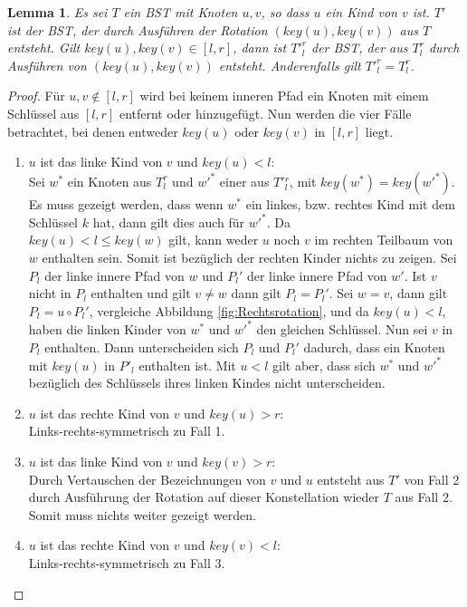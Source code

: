 \documentclass[a4paper,12pt]{article}
\newtheorem{Lemma}{Lemma}[section]
\begin{document}
\begin{Lemma}  \label{lemmaWilber1} Es sei $T$ ein BST mit Knoten $u, v$, so dass $u$ ein Kind von $v$ ist. $T'$ ist der BST, der durch Ausführen der Rotation $\left(\mathit{key}\left(u\right),\mathit{key}\left(v\right)\right)$ aus $T$ entsteht. Gilt $\mathit{key}\left(u\right),\mathit{key}\left(v\right) \in \left[l,r\right]$, dann ist ${T'}^r_l$ der BST, der aus $T^r_l$ durch Ausführen von  $\left(\mathit{key}\left(u\right),\mathit{key}\left(v\right)\right)$ entsteht. Anderenfalls gilt ${T'}^r_l = T^r_l$.
\end{Lemma}
\begin{proof}
	\noindent Für $u,v \notin \left[l,r\right]$ wird bei keinem inneren Pfad ein Knoten mit einem Schlüssel aus $\left[l,r\right]$ entfernt oder hinzugefügt.
	Nun werden die vier Fälle betrachtet, bei denen entweder $\mathit{key}\left(u\right)$ oder $\mathit{key}\left(v\right)$ in $\left[l,r\right]$ liegt.
	\begin{enumerate}
		\item $u$ ist das linke Kind von $v$ und $\mathit{key}\left(u\right) < l$:\\
		Sei $w^*$ ein Knoten aus $T^r_l$ und $w'^*$ einer aus $T'{^r_l}$, mit $\mathit{key}(w^*) = \mathit{key}(w'^*)$. Es muss gezeigt werden, dass wenn $w^*$ ein linkes, bzw. rechtes Kind mit dem Schlüssel $k$ hat, dann gilt dies auch für $w'^*$. Da \\$\mathit{key}(u) < l \leq \mathit{key}(w) $ gilt, kann weder $u$ noch $v$ im rechten Teilbaum von $w$ enthalten sein. Somit ist bezüglich der rechten Kinder nichts zu zeigen. 
		Sei $P_l$ der linke innere Pfad von $w$ und $ {P_l}'$ der linke innere Pfad von $w'$. Ist $v$ nicht in $P_l$ enthalten und gilt $v \neq w$ dann gilt $P_l = P{_l}'$. Sei $w = v$, dann gilt $P_l = u  \circ  {P_l}'$, vergleiche Abbildung \ref{fig:Rechtsrotation}, und da $\mathit{key}(u) < l$, haben die linken Kinder von $w^*$ und $w'^*$ den gleichen Schlüssel. Nun sei $v$ in $P_l$ enthalten. Dann unterscheiden sich  $P_l$ und  ${P_l}'$ dadurch, dass ein Knoten mit $\mathit{key}(u)$ in $P'_l$ enthalten ist. Mit $u < l$ gilt aber, dass sich $w^*$ und $w'^*$ bezüglich des Schlüssels ihres linken Kindes nicht unterscheiden.
	   	\item $u$ ist das rechte Kind von $v$ und $\mathit{key}\left(u\right) > r$:\\
	    Links-rechts-symmetrisch zu Fall 1. 	
		\item $u$ ist das linke Kind von $v$ und $\mathit{key}\left(v\right) > r$:\\
		Durch Vertauschen der Bezeichnungen von $v$ und $u$ entsteht aus $T'$ von Fall 2 durch Ausführung der Rotation auf dieser Konstellation wieder $T$ aus Fall 2. Somit muss nichts weiter gezeigt werden. 
		\item $u$ ist das rechte Kind von $v$ und $\mathit{key}\left(v\right) < l$:\\
		Links-rechts-symmetrisch zu Fall 3. \\
		

\end{enumerate}
\end{proof}
\end{document}
